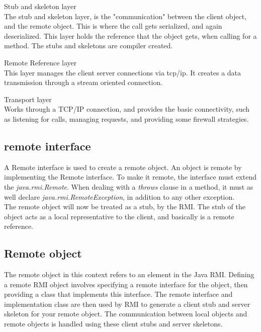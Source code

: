 \begin{description}
 \item{Stub and skeleton layer} \hfill \\
The stub and skeleton layer, is the "communication" between the client object, and the remote object. This is where the call gets serialized, and again deserialized. This layer holds the reference that the object gets, when calling for a method. The stubs and skeletons are compiler created.

 \item{Remote Reference layer} \hfill \\

This layer manages the client server connections via tcp/ip. It creates a data transmission through a stream oriented connection.

 \item{Transport layer} \hfill \\

Works through a TCP/IP connection, and provides the basic connectivity, such as listening for calls, managing requests, and providing some firewall strategies.
\end{description}

\subsection{remote interface}
A Remote interface is used to create a remote object. An object is remote by implementing the Remote interface. To make it remote, the interface must extend the \emph{java.rmi.Remote}. When dealing with a \emph{throws} clause in a method, it must as well declare \emph{java.rmi.RemoteException}, in addition to any other exception.\\

The remote object will now be treated as a stub, by the RMI. The stub of the object acts as a local representative to the client, and basically is a remote reference.


\subsection{Remote object}
The remote object in this context refers to an element in the Java RMI. Defining a remote RMI object involves specifying a remote interface for the object, then providing a class that implements this interface. The remote interface and implementation class are then used by RMI to generate a client stub and server skeleton for your remote object. The communication between local objects and remote objects is handled using these client stubs and server skeletons.

